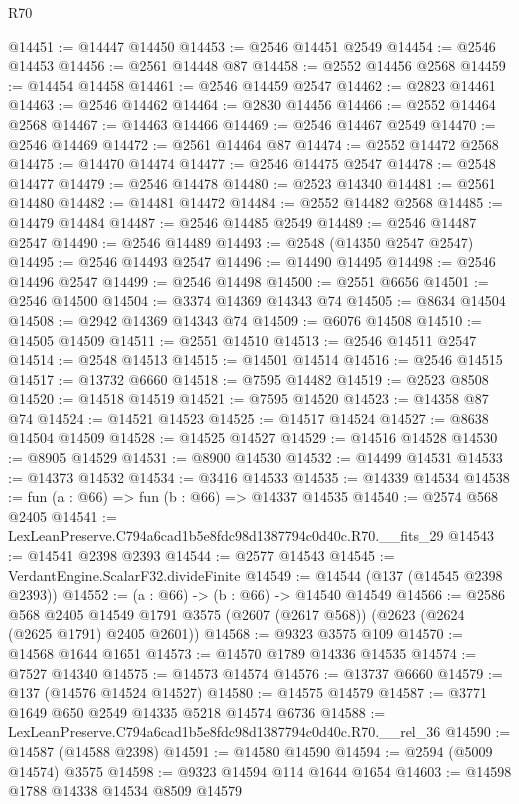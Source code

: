 \begin{lexlean}{R70}
\begin{coremodule}
@14451 := @14447 @14450
@14453 := @2546 @14451 @2549
@14454 := @2546 @14453
@14456 := @2561 @14448 @87
@14458 := @2552 @14456 @2568
@14459 := @14454 @14458
@14461 := @2546 @14459 @2547
@14462 := @2823 @14461
@14463 := @2546 @14462
@14464 := @2830 @14456
@14466 := @2552 @14464 @2568
@14467 := @14463 @14466
@14469 := @2546 @14467 @2549
@14470 := @2546 @14469
@14472 := @2561 @14464 @87
@14474 := @2552 @14472 @2568
@14475 := @14470 @14474
@14477 := @2546 @14475 @2547
@14478 := @2548 @14477
@14479 := @2546 @14478
@14480 := @2523 @14340
@14481 := @2561 @14480
@14482 := @14481 @14472
@14484 := @2552 @14482 @2568
@14485 := @14479 @14484
@14487 := @2546 @14485 @2549
@14489 := @2546 @14487 @2547
@14490 := @2546 @14489
@14493 := @2548 (@14350 @2547 @2547)
@14495 := @2546 @14493 @2547
@14496 := @14490 @14495
@14498 := @2546 @14496 @2547
@14499 := @2546 @14498
@14500 := @2551 @6656
@14501 := @2546 @14500
@14504 := @3374 @14369 @14343 @74
@14505 := @8634 @14504
@14508 := @2942 @14369 @14343 @74
@14509 := @6076 @14508
@14510 := @14505 @14509
@14511 := @2551 @14510
@14513 := @2546 @14511 @2547
@14514 := @2548 @14513
@14515 := @14501 @14514
@14516 := @2546 @14515
@14517 := @13732 @6660
@14518 := @7595 @14482
@14519 := @2523 @8508
@14520 := @14518 @14519
@14521 := @7595 @14520
@14523 := @14358 @87 @74
@14524 := @14521 @14523
@14525 := @14517 @14524
@14527 := @8638 @14504 @14509
@14528 := @14525 @14527
@14529 := @14516 @14528
@14530 := @8905 @14529
@14531 := @8900 @14530
@14532 := @14499 @14531
@14533 := @14373 @14532
@14534 := @3416 @14533
@14535 := @14339 @14534
@14538 := fun (a : @66) => fun (b : @66) => @14337 @14535
@14540 := @2574 @568 @2405
@14541 := LexLeanPreserve.C794a6cad1b5e8fdc98d1387794c0d40c.R70.__fits_29
@14543 := @14541 @2398 @2393
@14544 := @2577 @14543
@14545 := VerdantEngine.ScalarF32.divideFinite
@14549 := @14544 (@137 (@14545 @2398 @2393))
@14552 := (a : @66) -> (b : @66) -> @14540 @14549
@14566 := @2586
    @568
    @2405
    @14549
    @1791
    @3575
    (@2607 (@2617 @568))
    (@2623 (@2624 (@2625 @1791) @2405 @2601))
@14568 := @9323 @3575 @109
@14570 := @14568 @1644 @1651
@14573 := @14570 @1789 @14336 @14535
@14574 := @7527 @14340
@14575 := @14573 @14574
@14576 := @13737 @6660
@14579 := @137 (@14576 @14524 @14527)
@14580 := @14575 @14579
@14587 := @3771 @1649 @650 @2549 @14335 @5218 @14574 @6736
@14588 := LexLeanPreserve.C794a6cad1b5e8fdc98d1387794c0d40c.R70.__rel_36
@14590 := @14587 (@14588 @2398)
@14591 := @14580 @14590
@14594 := @2594 (@5009 @14574) @3575
@14598 := @9323 @14594 @114 @1644 @1654
@14603 := @14598 @1788 @14338 @14534 @8509 @14579

\end{coremodule}
\end{lexlean}
